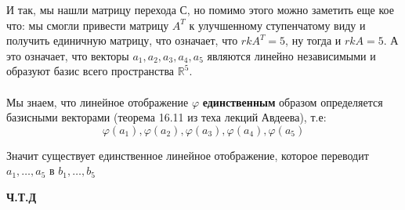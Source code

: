 \documentclass[a4paper,12pt]{article}
\begin{document}
И так, мы нашли матрицу перехода С, но помимо этого можно заметить еще кое что: мы смогли привести матрицу $A^T$ к улучшенному ступенчатому виду и получить единичную матрицу, что означает, что $rk A^T = 5$, ну тогда и $rk A = 5$. А это означает, что векторы $a_1, a_2, a_3, a_4, a_5$ являются линейно независимыми и образуют базис всего пространства $\mathbb{R}^5$.
\\\\
Мы знаем, что линейное отображение $\varphi$ \textbf{единственным} образом определяется базисными векторами (теорема 16.11 из теха лекций Авдеева), т.е:
\[
\varphi \left(a_1\right), \varphi \left(a_2\right), \varphi \left(a_3\right), \varphi \left(a_4\right), \varphi \left(a_5\right) 
\]

Значит существует единственное линейное отображение, которое переводит $a_1, \ldots, a_5$ в $b_1, \ldots, b_5$
\begin{center}
\textbf{Ч.Т.Д}
\end{center}
\clearpage
\end{document}
